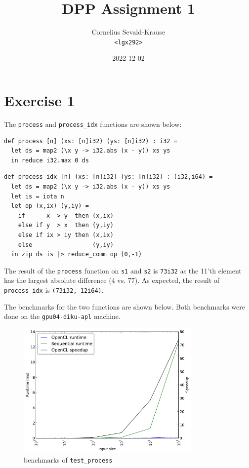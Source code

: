 \documentclass{article}
\begin{document}
\title{DPP Assignment 1}
\author{Cornelius Sevald-Krause \\ \texttt{<lgx292>}}
\date{2022-12-02}
\maketitle

\section*{Exercise 1}

The \verb|process| and \verb|process_idx| functions are shown below:

\begin{verbatim}
def process [n] (xs: [n]i32) (ys: [n]i32) : i32 =
  let ds = map2 (\x y -> i32.abs (x - y)) xs ys
  in reduce i32.max 0 ds
\end{verbatim}

\begin{verbatim}
def process_idx [n] (xs: [n]i32) (ys: [n]i32) : (i32,i64) =
  let ds = map2 (\x y -> i32.abs (x - y)) xs ys
  let is = iota n
  let op (x,ix) (y,iy) =
    if      x  > y  then (x,ix)
    else if y  > x  then (y,iy)
    else if ix > iy then (x,ix)
    else                 (y,iy)
  in zip ds is |> reduce_comm op (0,-1)
\end{verbatim}

The result of the \verb|process| function on \verb|s1| and \verb|s2| is \verb|73i32| as the 11'th
element has the largest absolute difference (4 vs. 77). As expected, the result
of \verb|process_idx| is \verb|(73i32, 12i64)|.

The benchmarks for the two functions are shown below.
Both benchmarks were done on the \verb|gpu04-diku-apl| machine.

\begin{figure}
    \centering
    \includegraphics[width=0.8\textwidth]{test_process.pdf}
    \caption{benchmarks of \texttt{test\_process}}
\end{figure}
\end{document}
